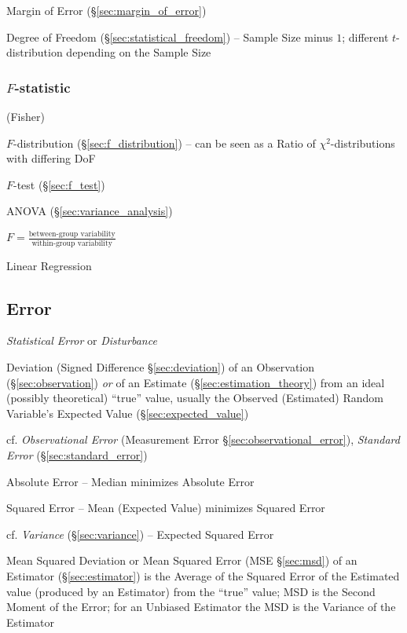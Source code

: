 Margin of Error (\S\ref{sec:margin_of_error})

Degree of Freedom (\S\ref{sec:statistical_freedom}) -- Sample Size minus $1$;
different $t$-distribution depending on the Sample Size



\subsubsection{$F$-statistic}\label{sec:f_statistic}

(Fisher)

$F$-distribution (\S\ref{sec:f_distribution}) -- can be seen as a Ratio of
$\chi^2$-distributions with differing DoF

$F$-test (\S\ref{sec:f_test})

ANOVA (\S\ref{sec:variance_analysis})

$F = \frac{\text{between-group variability}}{\text{within-group variability}}$

Linear Regression



\subsection{Error}\label{sec:error}

\emph{Statistical Error} or \emph{Disturbance}

Deviation (Signed Difference \S\ref{sec:deviation}) of an Observation
(\S\ref{sec:observation}) \emph{or} of an Estimate
(\S\ref{sec:estimation_theory}) from an ideal (possibly theoretical) ``true''
value, usually the Observed (Estimated) Random Variable's Expected Value
(\S\ref{sec:expected_value})

\fist cf. \emph{Observational Error} (Measurement Error
\S\ref{sec:observational_error}), \emph{Standard Error}
  (\S\ref{sec:standard_error})

Absolute Error -- Median minimizes Absolute Error

Squared Error -- Mean (Expected Value) minimizes Squared Error

cf. \emph{Variance} (\S\ref{sec:variance}) -- Expected Squared Error

\fist Mean Squared Deviation or Mean Squared Error (MSE \S\ref{sec:msd}) of an
Estimator (\S\ref{sec:estimator}) is the Average of the Squared Error of the
Estimated value (produced by an Estimator) from the ``true'' value; MSD is
the Second Moment of the Error; for an Unbiased Estimator the MSD is the
Variance of the Estimator

